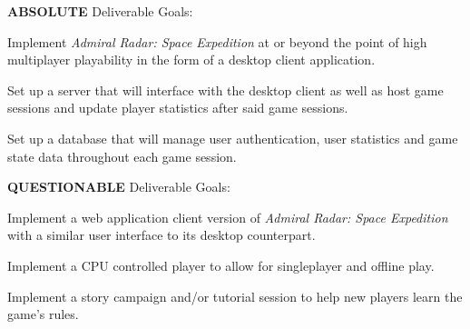 \textbf{ABSOLUTE} Deliverable Goals:

  \item Implement \textit{Admiral Radar: Space Expedition} at or beyond the point of high multiplayer playability in the form of a desktop client application.
  \item Set up a server that will interface with the desktop client as well as host game sessions and update player statistics after said game sessions.
  \item Set up a database that will manage user authentication, user statistics and game state data throughout each game session.
  
\textbf{QUESTIONABLE} Deliverable Goals:

  \item Implement a web application client version of \textit{Admiral Radar: Space Expedition} with a similar user interface to its desktop counterpart.
  \item Implement a CPU controlled player to allow for singleplayer and offline play.
  \item Implement a story campaign and/or tutorial session to help new players learn the game’s rules.
